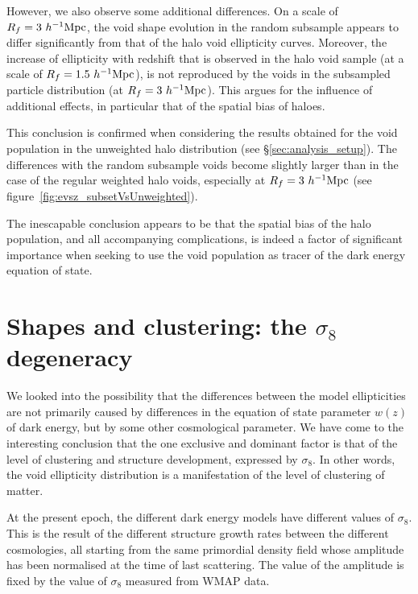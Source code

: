 However, we also observe some additional differences. On a scale of $R_f=3~h^{-1} {\rm Mpc}$, the void shape evolution 
in the random subsample appears to differ significantly from that of the halo void ellipticity curves. 
Moreover, the increase of ellipticity with redshift that 
is observed in the halo void sample (at a scale of $R_f=1.5~h^{-1} {\rm Mpc}$), is not reproduced by the 
voids in the subsampled particle distribution (at $R_f=3~h^{-1} {\rm Mpc}$). This argues for the influence of additional effects, 
in particular that of the spatial bias of haloes. 

This conclusion is confirmed when considering the results obtained for the void population in the 
unweighted halo distribution (see \S\ref{sec:analysis_setup}). The differences with the 
random subsample voids become slightly larger than in the case of the regular weighted halo 
voids, especially at $R_f = 3 ~h^{-1} {\rm Mpc}$ (see figure~\ref{fig:evsz_subsetVsUnweighted}). 

The inescapable conclusion appears to be that the spatial bias of the halo population, and 
all accompanying complications, is indeed a factor of significant importance when seeking to 
use the void population as tracer of the dark energy equation of state. 

\section{Shapes and clustering: the \texorpdfstring{$\sigma_8$}{sigma} degeneracy}
\label{sec:sigma8}
We looked into the possibility that the differences between the model ellipticities are not primarily 
caused by differences in the equation of state parameter $w(z)$ of dark energy, but by some other 
cosmological parameter. We have come to the interesting conclusion that the one exclusive and dominant 
factor is that of the level of clustering and structure development, expressed by $\sigma_8$. 
In other words, the void ellipticity distribution is a manifestation of the level of clustering 
of matter.

At the present epoch, the different dark energy models have different values of $\sigma_8$. This is 
the result of the different structure growth rates between the different cosmologies, all starting 
from the same primordial density field whose amplitude has been normalised at the time of last 
scattering. The value of the amplitude is fixed by the value of $\sigma_8$ measured from WMAP data. 

